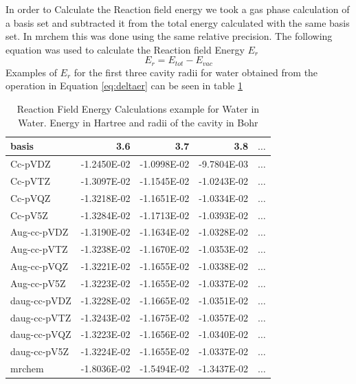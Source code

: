 \documentclass[../master_thesis.tex]{subfiles}
\begin{document}
In order to Calculate the Reaction field energy we took a gas phase calculation
of a basis set and subtracted it from the total energy calculated with the same
basis set. In mrchem this was done using the same relative precision. The
following equation was used to calculate the Reaction field Energy $E_r$
\begin{equation}\label{eq:deltaer}
  E_r = E_{tot} - E_{vac}
\end{equation}
Examples of $E_r$ for the first three cavity radii for water obtained from the operation
in Equation \ref{eq:deltaer} can be seen in table \ref{tab:Erwatdata}

\begin{table}[htbp]
\caption{Reaction Field Energy Calculations example for Water in Water. Energy in Hartree and radii of the cavity in Bohr}
\begin{center}
\begin{tabular}{|l|r|r|r|r|}
\hline
basis & 3.6 & 3.7 & 3.8 & $\ldots$\\ \hline
Cc-pVDZ & -1.2450E-02 & -1.0998E-02 & -9.7804E-03 & $\ldots$\\ \hline
Cc-pVTZ & -1.3097E-02 & -1.1545E-02 & -1.0243E-02 & $\ldots$\\ \hline
Cc-pVQZ & -1.3218E-02 & -1.1651E-02 & -1.0334E-02 & $\ldots$\\ \hline
Cc-pV5Z & -1.3284E-02 & -1.1713E-02 & -1.0393E-02 & $\ldots$\\ \hline
Aug-cc-pVDZ & -1.3190E-02 & -1.1634E-02 & -1.0328E-02 & $\ldots$\\ \hline
Aug-cc-pVTZ & -1.3238E-02 & -1.1670E-02 & -1.0353E-02 & $\ldots$\\ \hline
Aug-cc-pVQZ & -1.3221E-02 & -1.1655E-02 & -1.0338E-02 & $\ldots$\\ \hline
Aug-cc-pV5Z & -1.3223E-02 & -1.1655E-02 & -1.0337E-02 & $\ldots$\\ \hline
daug-cc-pVDZ & -1.3228E-02 & -1.1665E-02 & -1.0351E-02 & $\ldots$\\ \hline
daug-cc-pVTZ & -1.3243E-02 & -1.1675E-02 & -1.0357E-02 & $\ldots$\\ \hline
daug-cc-pVQZ & -1.3223E-02 & -1.1656E-02 & -1.0340E-02 & $\ldots$\\ \hline
daug-cc-pV5Z & -1.3224E-02 & -1.1655E-02 & -1.0337E-02 & $\ldots$\\ \hline
mrchem & -1.8036E-02 & -1.5494E-02 & -1.3437E-02 & $\ldots$\\ \hline
\end{tabular}
\end{center}
\label{tab:Erwatdata}
\end{table}
\end{document}
